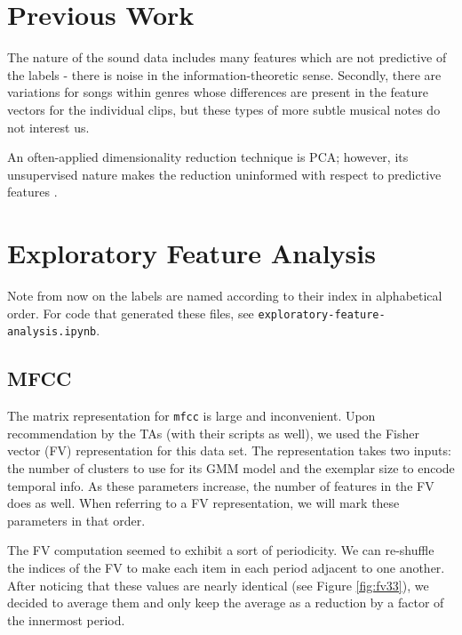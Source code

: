 \documentclass{article}
\begin{document}
\section{Previous Work}

The nature of the sound data includes many features which are not predictive of the labels - there is noise in the information-theoretic sense. Secondly, there are variations for songs within genres whose differences are present in the feature vectors for the individual clips, but these types of more subtle musical notes do not interest us.

An often-applied dimensionality reduction technique is PCA; however, its unsupervised nature makes the reduction uninformed with respect to predictive features \cite{WellingNote}.

\section{Exploratory Feature Analysis}

Note from now on the labels are named according to their index in alphabetical order. For code that generated these files, see \texttt{exploratory-feature-analysis.ipynb}.

\subsection{MFCC}

The matrix representation for \texttt{mfcc} is large and inconvenient. Upon recommendation by the TAs (with their scripts as well), we used the Fisher vector (FV) representation for this data set. The representation takes two inputs: the number of clusters to use for its GMM model and the exemplar size to encode temporal info. As these parameters increase, the number of features in the FV does as well. When referring to a FV representation, we will mark these parameters in that order.

The FV computation seemed to exhibit a sort of periodicity. We can re-shuffle the indices of the FV to make each item in each period adjacent to one another. After noticing that these values are nearly identical (see Figure \ref{fig:fv33}), we decided to average them and only keep the average as a reduction by a factor of the innermost period.
\end{document}
